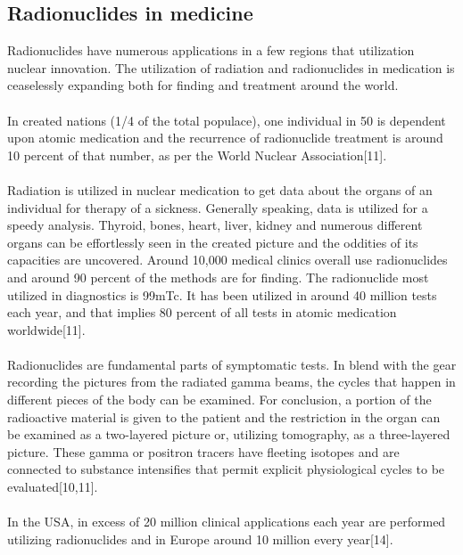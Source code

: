 \documentclass[12pt]{article}
\begin{document}
\subsection{ Radionuclides in medicine}
Radionuclides have numerous applications in a few regions that utilization nuclear innovation. The utilization of radiation and radionuclides in medication is ceaselessly expanding both for finding and treatment around the world.
\\
\\
In created nations (1/4 of the total populace), one individual in 50 is dependent upon atomic medication and the recurrence of radionuclide treatment is around 10 percent of that number, as per the World Nuclear Association[11].
\\
\\
Radiation is utilized in nuclear medication to get data about the organs of an individual for therapy of a sickness. Generally speaking, data is utilized for a speedy analysis. Thyroid, bones, heart, liver, kidney and numerous different organs can be effortlessly seen in the created picture and the oddities of its capacities are uncovered. Around 10,000 medical clinics overall use radionuclides and around 90 percent of the methods are for finding. The radionuclide most utilized in diagnostics is 99mTc. It has been utilized in around 40 million tests each year, and that implies 80 percent of all tests in atomic medication worldwide[11].
\\
\\
Radionuclides are fundamental parts of symptomatic tests. In blend with the gear recording the pictures from the radiated gamma beams, the cycles that happen in different pieces of the body can be examined. For conclusion, a portion of the radioactive material is given to the patient and the restriction in the organ can be examined as a two-layered picture or, utilizing tomography, as a three-layered picture. These gamma or positron tracers have fleeting isotopes and are connected to substance intensifies that permit explicit physiological cycles to be evaluated[10,11].
\\
\\
In the USA, in excess of 20 million clinical applications each year are performed utilizing radionuclides and in Europe around 10 million every year[14].
\end{document}
